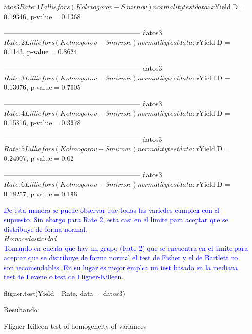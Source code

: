 \documentclass[a4paper,12pt]{article}
\begin{document}
\begin{enumerate}[label=\textbf{\alph*})]
\begin{MyVerbatim}
atos3$Rate: 1

Lilliefors (Kolmogorov-Smirnov) normality test

data:  x$Yield
D = 0.19346, p-value = 0.1368

------------------------------------------------------------ 
datos3$Rate: 2

Lilliefors (Kolmogorov-Smirnov) normality test

data:  x$Yield
D = 0.1143, p-value = 0.8624

------------------------------------------------------------ 
datos3$Rate: 3

Lilliefors (Kolmogorov-Smirnov) normality test

data:  x$Yield
D = 0.13076, p-value = 0.7005

------------------------------------------------------------ 
datos3$Rate: 4

Lilliefors (Kolmogorov-Smirnov) normality test

data:  x$Yield
D = 0.15816, p-value = 0.3978

------------------------------------------------------------ 
datos3$Rate: 5

Lilliefors (Kolmogorov-Smirnov) normality test

data:  x$Yield
D = 0.24007, p-value = 0.02

------------------------------------------------------------ 
datos3$Rate: 6

Lilliefors (Kolmogorov-Smirnov) normality test

data:  x$Yield
D = 0.18257, p-value = 0.196
	\end{MyVerbatim}

\textcolor{blue}{De esta manera se puede observar que todas las variedes cumplen con el supuesto. Sin ebargo para Rate 2, esta casi en el limite para aceptar que se distribuye de forma normal.}\\

\textit{Homocedasticidad}\\
	
\textcolor{blue}{Tomando en cuenta que hay un grupo (Rate 2) que se encuentra en el límite para aceptar que se distribuye de forma normal el test de Fisher y el de Bartlett no son recomendables. En su lugar es mejor emplea un test basado en la mediana test de Levene o test de Fligner-Killeen.}

\begin{MyVerbatim}
fligner.test(Yield ~ Rate, data = datos3)
\end{MyVerbatim}
Resultando:
\begin{MyVerbatim}
Fligner-Killeen test of homogeneity of variances


\end{MyVerbatim}
\end{enumerate}
\end{document}
